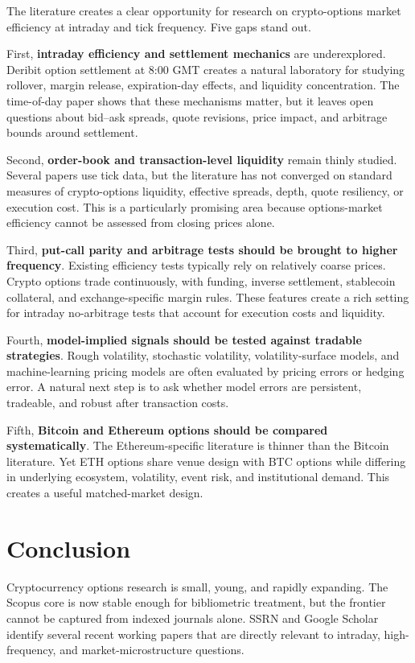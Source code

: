 \documentclass[11pt,a4paper]{article}
\begin{document}
The literature creates a clear opportunity for research on crypto-options market efficiency at intraday and tick frequency. Five gaps stand out.

First, \textbf{intraday efficiency and settlement mechanics} are underexplored. Deribit option settlement at 8:00 GMT creates a natural laboratory for studying rollover, margin release, expiration-day effects, and liquidity concentration. The time-of-day paper shows that these mechanisms matter, but it leaves open questions about bid--ask spreads, quote revisions, price impact, and arbitrage bounds around settlement.

Second, \textbf{order-book and transaction-level liquidity} remain thinly studied. Several papers use tick data, but the literature has not converged on standard measures of crypto-options liquidity, effective spreads, depth, quote resiliency, or execution cost. This is a particularly promising area because options-market efficiency cannot be assessed from closing prices alone.

Third, \textbf{put-call parity and arbitrage tests should be brought to higher frequency}. Existing efficiency tests typically rely on relatively coarse prices. Crypto options trade continuously, with funding, inverse settlement, stablecoin collateral, and exchange-specific margin rules. These features create a rich setting for intraday no-arbitrage tests that account for execution costs and liquidity.

Fourth, \textbf{model-implied signals should be tested against tradable strategies}. Rough volatility, stochastic volatility, volatility-surface models, and machine-learning pricing models are often evaluated by pricing errors or hedging error. A natural next step is to ask whether model errors are persistent, tradeable, and robust after transaction costs.

Fifth, \textbf{Bitcoin and Ethereum options should be compared systematically}. The Ethereum-specific literature is thinner than the Bitcoin literature. Yet ETH options share venue design with BTC options while differing in underlying ecosystem, volatility, event risk, and institutional demand. This creates a useful matched-market design.

\section{Conclusion}

Cryptocurrency options research is small, young, and rapidly expanding. The Scopus core is now stable enough for bibliometric treatment, but the frontier cannot be captured from indexed journals alone. SSRN and Google Scholar identify several recent working papers that are directly relevant to intraday, high-frequency, and market-microstructure questions.
\end{document}
